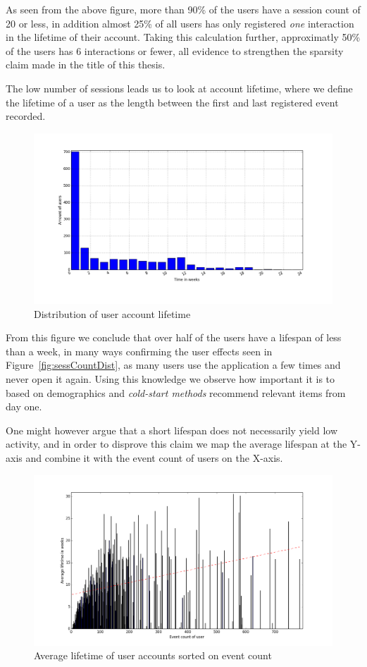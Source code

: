 As seen from the above figure, more than 90\% of the users have a session count
of 20 or less, in addition almost 25\% of all users has only registered
\textit{one} interaction in the lifetime of their account. Taking this
calculation further, approximatly 50\% of the users has 6 interactions or fewer, all
evidence to strengthen the sparsity claim made in the title of this thesis.

The low number of sessions leads us to look at account lifetime, where we
define the lifetime of a user as the length between the first and last
registered event recorded.

\begin{figure}[H]
  \includegraphics[width=5in]{image/userTimespansdistribution.png}
  \centering
  \caption{Distribution of user account lifetime}
  \label{figure:userTimespandist}
\end{figure}

From this figure we conclude that over half of the users have a lifespan of
less than a week, in many ways confirming the user effects seen in
Figure~\ref{fig:sessCountDist}, as many users use the application a few times
and never open it again. Using this knowledge we observe how important it is to
based on demographics and \textit{cold-start methods} recommend relevant items
from day one.

One might however argue that a short lifespan does not necessarily yield low
activity, and in order to disprove this claim we map the average lifespan at
the Y-axis and combine it with the event count of users on the X-axis.

\begin{figure}[H]
  \includegraphics[width=5in]{image/avglifetimeoncountuser.png}
  \centering
  \caption{Average lifetime of user accounts sorted on event count}
  \label{figure:avglifetimeoncountuser}
\end{figure}

